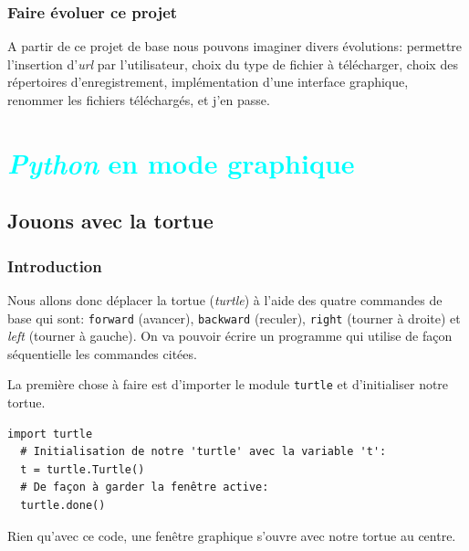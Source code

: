 \documentclass[a4paper,12pt]{book}
\begin{document}
\section{Faire évoluer ce projet}
A partir de ce projet de base nous pouvons imaginer divers évolutions: permettre l'insertion d'\textit{url} par l'utilisateur, choix du type de fichier à télécharger, choix des répertoires d'enregistrement, implémentation d'une interface graphique, renommer les fichiers téléchargés, et j'en passe.
\medskip

\part{\textcolor{cyan}{\textit{Python} en mode graphique}}
\chapter{Jouons avec la tortue}
\section{Introduction}
Nous allons donc déplacer la tortue (\textit{turtle}) à l'aide des quatre commandes de base qui sont: \texttt{forward} (avancer), \texttt{backward} (reculer), \texttt{right} (tourner à droite) et \textit{left} (tourner à gauche). On va pouvoir écrire un programme qui utilise de façon séquentielle les commandes citées.
\medskip

La première chose à faire est d'importer le module \texttt{turtle} et d'initialiser notre tortue.
\begin{lstlisting}[caption=Les trois lignes d'initialisation de notre fenêtre graphique]
  import turtle
  # Initialisation de notre 'turtle' avec la variable 't':
  t = turtle.Turtle()
  # De façon à garder la fenêtre active:
  turtle.done()
\end{lstlisting}
\medskip

Rien qu'avec ce code, une fenêtre graphique s'ouvre avec notre tortue au centre.
\medskip
\end{document}
